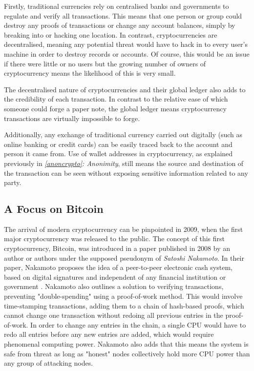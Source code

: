 Firstly, traditional currencies rely on centralised banks and governments to regulate and verify all transactions. This means that one person or group could destroy any proofs of transactions or change any account balances, simply by breaking into or hacking one location. In contrast, cryptocurrencies are decentralised, meaning any potential threat would have to hack in to every user's machine in order to destroy records or accounts. Of course, this would be an issue if there were little or no users but the growing number of owners of cryptocurrency means the likelihood of this is very small.

The decentralised nature of cryptocurrencies and their global ledger also adds to the credibility of each transaction. In contrast to the relative ease of which someone could forge a paper note, the global ledger means cryptocurrency transactions are virtually impossible to forge.

Additionally, any exchange of traditional currency carried out digitally (such as online banking or credit cards) can be easily traced back to the account and person it came from. Use of wallet addresses in cryptocurrency, as explained previously in \textit{\ref{anoncrypto}: Anonimity}, still means the source and destination of the transaction can be seen without exposing sensitive information related to any party.

\subsection{A Focus on Bitcoin}\label{btcsec}
The arrival of modern cryptocurrency can be pinpointed in 2009, when the first major cryptocurrency was released to the public. The concept of this first cryptocurrency, Bitcoin, was introduced in a paper published in 2008 by an author or authors under the supposed pseudonym of \textit{Satoshi Nakamoto}. In their paper, Nakamoto proposes the idea of a peer-to-peer electronic cash system, based on digital signatures and independent of any financial institution or government \cite{snakamoto}. Nakamoto also outlines a solution to verifying transactions, preventing "double-spending" using a proof-of-work method. This would involve time-stamping transactions, adding them  to a chain of hash-based proofs, which cannot change one transaction without redoing all previous entries in the proof-of-work. In order to change any entries in the chain, a single CPU would have to redo all entries before any new entries are added, which would require phenomenal computing power. Nakamoto also adds that this means the system is safe from threat as long as "honest" nodes collectively hold more CPU power than any group of attacking nodes.


